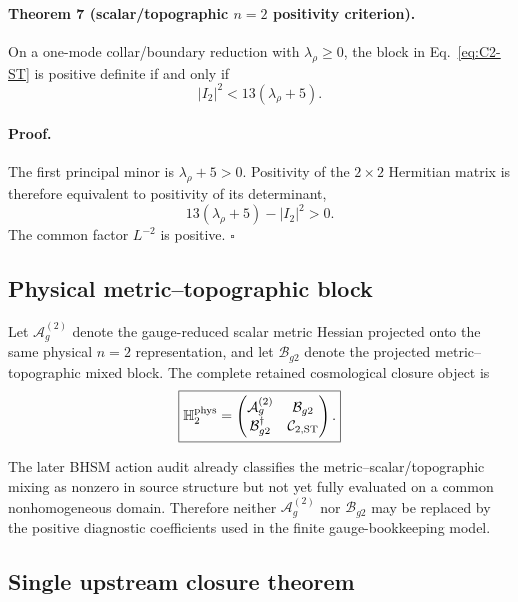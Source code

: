 \paragraph{Theorem 7 (scalar/topographic $n=2$ positivity criterion).}
On a one-mode collar/boundary reduction with
$\lambda_\rho\ge0$, the block in Eq.~\eqref{eq:C2-ST} is positive definite if
and only if
\begin{equation}
\boxed{
|I_2|^2
<
13(\lambda_\rho+5).
}
\label{eq:I2-positivity}
\end{equation}

\paragraph{Proof.}
The first principal minor is $\lambda_\rho+5>0$.  Positivity of the
$2\times2$ Hermitian matrix is therefore equivalent to positivity of its
determinant,
\[
13(\lambda_\rho+5)-|I_2|^2>0.
\]
The common factor $L^{-2}$ is positive. \hfill$\square$

\subsection{Physical metric--topographic block}

Let $\mathcal A_g^{(2)}$ denote the gauge-reduced scalar metric Hessian
projected onto the same physical $n=2$ representation, and let
$\mathcal B_{g2}$ denote the projected metric--topographic mixed block.  The
complete retained cosmological closure object is
\begin{equation}
\boxed{
\mathbb H_2^{\rm phys}
=
\begin{pmatrix}
\mathcal A_g^{(2)} & \mathcal B_{g2}\\
\mathcal B_{g2}^\dagger & \mathcal C_{2,\rm ST}
\end{pmatrix}.
}
\label{eq:H2-phys}
\end{equation}

The later BHSM action audit already classifies the metric--scalar/topographic
mixing as nonzero in source structure but not yet fully evaluated on a common
nonhomogeneous domain.  Therefore neither
$\mathcal A_g^{(2)}$ nor $\mathcal B_{g2}$ may be replaced by the positive
diagnostic coefficients used in the finite gauge-bookkeeping model.

\subsection{Single upstream closure theorem}

